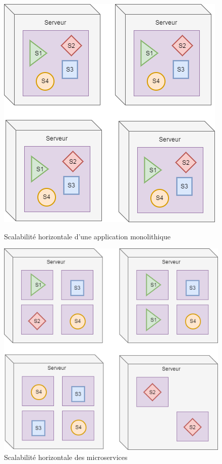 \begin{figure}[h!]
    \begin{minipage}{.5\textwidth}
    \raggedright
		\includegraphics[scale=0.55]{images/travailNeuflizeOBC/architecture/monolithScale.png}
		\caption{Scalabilité horizontale d'une application monolithique \\}
		\label{monolithScale}
    \end{minipage}%
    \hspace{0.5cm}
    \begin{minipage}{.5\textwidth}
        \includegraphics[scale=0.5]{images/travailNeuflizeOBC/architecture/microservicesScale.png}
		\caption{Scalabilité horizontale des microservices \\}
		\label{microservicesScale}
    \end{minipage}
\end{figure}

